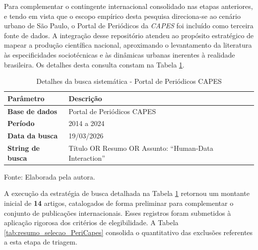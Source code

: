 \documentclass[
	12pt,				%
	oneside,			%
	a4paper,			%
	english,			%
	brazil				%
	]{abntex2ppgsi}
\begin{document}
    Para complementar o contingente internacional consolidado nas etapas anteriores, e tendo em vista que o escopo empírico desta pesquisa direciona-se ao cenário urbano de São Paulo, o Portal de Periódicos da \textit{CAPES} foi incluído como terceira fonte de dados. A integração desse repositório atendeu ao propósito estratégico de mapear a produção científica nacional, aproximando o levantamento da literatura às especificidades sociotécnicas e às dinâmicas urbanas inerentes à realidade brasileira. Os detalhes desta consulta constam na Tabela \ref{tab:detalhes_busca_capes}.

\begin{table}[htbp]
\centering
\caption{Detalhes da busca sistemática - Portal de Periódicos CAPES}
\label{tab:detalhes_busca_capes}
\renewcommand{\arraystretch}{1.4} 
\begin{tabular}{@{} >{\bfseries}p{3.5cm} p{11cm} @{}}
\toprule
Parâmetro & Descrição \\
\midrule
Base de dados & Portal de Periódicos CAPES \\
Período & 2014 a 2024 \\
Data da busca & 19/03/2026 \\
String de busca & Título OR Resumo OR Assunto: ``Human-Data Interaction'' \\
\bottomrule
\end{tabular}

\vspace{0.2cm} 
{\small Fonte: Elaborada pela autora.}
\end{table}

A execução da estratégia de busca detalhada na Tabela \ref{tab:detalhes_busca_capes} retornou um montante inicial de \textbf{14} artigos, catalogados de forma preliminar para complementar o conjunto de publicações internacionais. Esses registros foram submetidos à aplicação rigorosa dos critérios de elegibilidade. A Tabela \ref{tab:resumo_selecao_PeriCapes} consolida o quantitativo das exclusões referentes a esta etapa de triagem.
\end{document}
